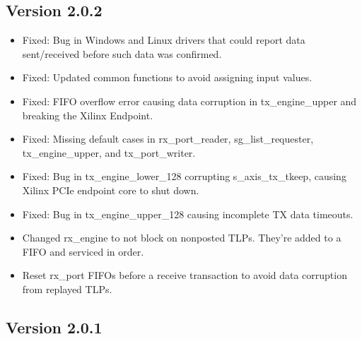 \documentclass{refrep}
\begin{document}
\subsection{Version 2.0.2}
\begin{itemize}

\item Fixed: Bug in Windows and Linux drivers that could report data sent/received 
  before such data was confirmed.
\item Fixed: Updated common functions to avoid assigning input values.
\item Fixed: FIFO overflow error causing data corruption in tx\_engine\_upper and
  breaking the Xilinx Endpoint.
\item Fixed: Missing default cases in rx\_port\_reader, sg\_list\_requester, 
  tx\_engine\_upper, and tx\_port\_writer.
\item Fixed: Bug in tx\_engine\_lower\_128 corrupting s\_axis\_tx\_tkeep, causing Xilinx
  PCIe endpoint core to shut down.
\item Fixed: Bug in tx\_engine\_upper\_128 causing incomplete TX data timeouts.
\item Changed rx\_engine to not block on nonposted TLPs. They're added to a FIFO and
  serviced in order. 
\item Reset rx\_port FIFOs before a receive transaction to avoid data corruption from
  replayed TLPs.
\end{itemize}

\subsection{Version 2.0.1}
\end{document}

